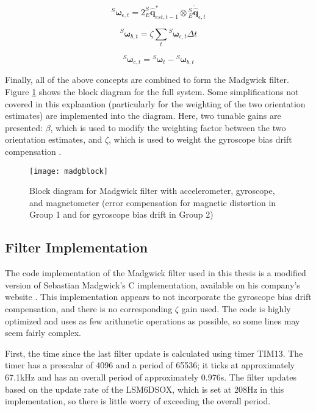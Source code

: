 \documentclass[11pt]{ucthesisCP}
\begin{document}
\begin{equation} \label{eq:gy1}
{}^S\boldsymbol{\omega}_{\epsilon,t} = 2^S_E\hat{\mathbf{q}}_{est,t-1}^* \otimes {}^S_E\dot{\hat{\mathbf{q}}}_{\epsilon,t}
\end{equation}

\begin{equation} \label{eq:gy2}
{}^S\boldsymbol{\omega}_{b,t} = \zeta \sum_t {}^S\boldsymbol{\omega}_{\epsilon,t} \Delta t
\end{equation}

\begin{equation} \label{eq:gy3}
{}^S\boldsymbol{\omega}_{c,t} = {}^S\boldsymbol{\omega}_t - {}^S\boldsymbol{\omega}_{b,t}
\end{equation}

Finally, all of the above concepts are combined to form the Madgwick filter. Figure \ref{fig:madgblock} shows the block diagram for the full system. Some simplifications not covered in this explanation (particularly for the weighting of the two orientation estimates) are implemented into the diagram. Here, two tunable gains are presented: \(\beta\), which is used to modify the weighting factor between the two orientation estimates, and \(\zeta\), which is used to weight the gyroscope bias drift compensation \cite{madgwick}.

\begin{figure}[htbp]
\centering
\texttt{[image: madgblock]}
\caption{Block diagram for Madgwick filter with accelerometer, gyroscope, and magnetometer (error compensation for magnetic distortion in Group 1 and for gyroscope bias drift in Group 2) \cite{madgwick}}
\label{fig:madgblock}
\end{figure}

\subsection{Filter Implementation} \label{ssec:4s4s3}
The code implementation of the Madgwick filter used in this thesis is a modified version of Sebastian Madgwick’s C implementation, available on his company’s website \cite{xiotech}. This implementation appears to not incorporate the gyroscope bias drift compensation, and there is no corresponding \(\zeta\) gain used. The code is highly optimized and uses as few arithmetic operations as possible, so some lines may seem fairly complex.

First, the time since the last filter update is calculated using timer TIM13. The timer has a prescalar of 4096 and a period of 65536; it ticks at approximately 67.1kHz and has an overall period of approximately 0.976s. The filter updates based on the update rate of the LSM6DSOX, which is set at 208Hz in this implementation, so there is little worry of exceeding the overall period.
\end{document}

